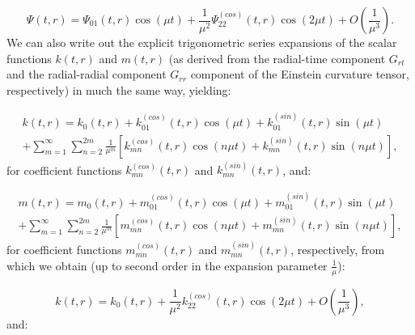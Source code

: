 \documentclass{article}
\begin{document}
\begin{equation}
\Psi \left( t, r \right) = \Psi_{0 1} \left( t, r \right) \cos \left( \mu t \right) + \frac{1}{\mu^2} \Psi_{2 2}^{\left( cos \right)} \left( t, r \right) \cos \left( 2 \mu t \right) + O \left( \frac{1}{\mu^3} \right).
\end{equation}
We can also write out the explicit trigonometric series expansions of the scalar functions ${k \left( t, r \right)}$ and ${m \left( t, r \right)}$ (as derived from the radial-time component ${G_{r t}}$ and the radial-radial component ${G_{r r}}$ component of the Einstein curvature tensor, respectively) in much the same way, yielding:

\begin{multline}
k \left( t, r \right) = k_0 \left( t, r \right) + k_{0 1}^{\left( cos \right)} \left( t, r \right) \cos \left( \mu t \right) + k_{0 1}^{\left( sin \right)} \left( t, r \right) \sin \left( \mu t \right)\\
+ \sum_{m = 1}^{\infty} \sum_{n = 2}^{2 m} \frac{1}{\mu^m} \left[ k_{m n}^{\left( cos \right)} \left( t, r \right) \cos \left( n \mu t \right) + k_{m n}^{\left( sin \right)} \left( t, r \right) \sin \left( n \mu t \right) \right],
\end{multline}
for coefficient functions ${k_{m n}^{\left( cos \right)} \left( t, r \right)}$ and ${k_{m n}^{\left( sin \right)} \left( t, r \right)}$, and:

\begin{multline}
m \left( t, r \right) = m_0 \left( t, r \right) + m_{0 1}^{\left( cos \right)} \left( t, r \right) \cos \left( \mu t \right) + m_{0 1}^{\left( sin \right)} \left( t, r \right) \sin \left( \mu t \right)\\
+ \sum_{m = 1}^{\infty} \sum_{n = 2}^{2m} \frac{1}{\mu^m} \left[ m_{m n}^{\left( cos \right)} \left( t, r \right) \cos \left( n \mu t \right) + m_{m n}^{\left( sin \right)} \left( t, r \right) \sin \left( n \mu t \right) \right],
\end{multline}
for coefficient functions ${m_{m n}^{\left( cos \right)} \left( t, r \right)}$ and ${m_{m n}^{\left( sin \right)} \left( t, r \right)}$, respectively, from which we obtain (up to second order in the expansion parameter ${\frac{1}{\mu}}$):

\begin{equation}
k \left( t, r \right) = k_0 \left( t, r \right) + \frac{1}{\mu^2} k_{2 2}^{\left( cos \right)} \left( t, r \right) \cos \left( 2 \mu t \right) + O \left( \frac{1}{\mu^3} \right),
\end{equation}
and:
\end{document}
